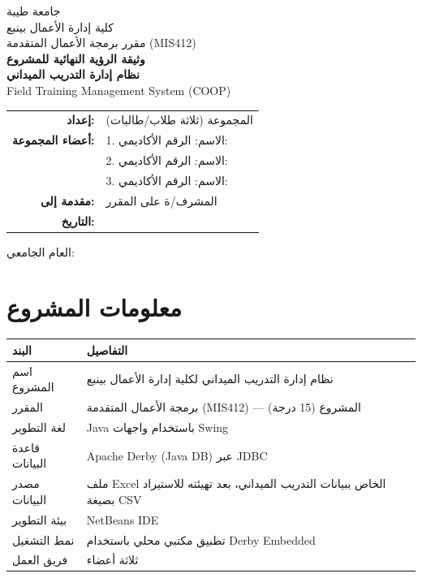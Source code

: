 \documentclass[12pt,a4paper]{article}
\begin{document}
\begin{titlepage}
\centering
\vspace*{1.5cm}
{\Large جامعة طيبة}\\[0.35cm]
{\large كلية إدارة الأعمال بينبع}\\[1.2cm]
{\Large مقرر برمجة الأعمال المتقدمة (MIS412)}\\[2.0cm]
{\Huge\bfseries وثيقة الرؤية النهائية للمشروع}\\[0.7cm]
{\LARGE\bfseries نظام إدارة التدريب الميداني}\\[0.3cm]
{\Large\textenglish{Field Training Management System (COOP)}}\\[1.8cm]
\begin{tabular}{rl}
\textbf{إعداد:} & المجموعة (ثلاثة طلاب/طالبات)\\[0.45cm]
\textbf{أعضاء المجموعة:} & 1. الاسم: \underline{\hspace{5cm}} \quad الرقم الأكاديمي: \underline{\hspace{2cm}}\\[0.45cm]
& 2. الاسم: \underline{\hspace{5cm}} \quad الرقم الأكاديمي: \underline{\hspace{2cm}}\\[0.45cm]
& 3. الاسم: \underline{\hspace{5cm}} \quad الرقم الأكاديمي: \underline{\hspace{2cm}}\\[0.45cm]
\textbf{مقدمة إلى:} & المشرف/ة على المقرر\\[0.45cm]
\textbf{التاريخ:} & \underline{\hspace{4cm}}
\end{tabular}
\vfill
{\large العام الجامعي: \underline{\hspace{3cm}}}
\end{titlepage}

\tableofcontents
\newpage

\section{معلومات المشروع}
\begin{tabularx}{\textwidth}{|p{3.5cm}|Y|}
\hline
\textbf{البند} & \textbf{التفاصيل}\\ \hline
اسم المشروع & نظام إدارة التدريب الميداني لكلية إدارة الأعمال بينبع\\ \hline
المقرر & برمجة الأعمال المتقدمة (MIS412) — المشروع (15 درجة)\\ \hline
لغة التطوير & Java باستخدام واجهات Swing\\ \hline
قاعدة البيانات & Apache Derby (Java DB) عبر JDBC\\ \hline
مصدر البيانات & ملف Excel الخاص ببيانات التدريب الميداني، بعد تهيئته للاستيراد بصيغة CSV\\ \hline
بيئة التطوير & NetBeans IDE\\ \hline
نمط التشغيل & تطبيق مكتبي محلي باستخدام Derby Embedded\\ \hline
فريق العمل & ثلاثة أعضاء\\ \hline
\end{tabularx}
\end{document}
